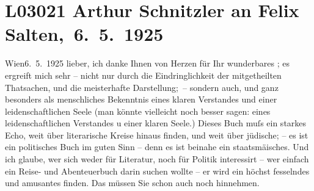 

\section[ Arthur Schnitzler an Felix Salten, 6. 5. 1925]{L03021 Arthur Schnitzler an Felix Salten, 6. 5. 1925}
\nopagebreak{}
\rehead{ }\normalsize\beginnumbering{}
\toendnotes[C]{\smallbreak\pagebreak[2]}
\toendnotes[C]{\smallbreak}
\pstart
           \raggedleft{}{\pb}Wien6. 5. 1925\pend
           \vspace{0.5em}
\pstart
           lieber, ich danke Ihnen von Herzen für Ihr wunderbares \label{K_L03021-1v}\label{K_L03021-1}; es
               ergreift mich sehr – nicht nur durch die Eindringlichkeit der mitgetheilten
               Thatsachen, und die meisterhafte Darstellung; – sondern auch, und ganz besonders als
               menschliches Bekenntnis eines klaren Verstandes und einer leidenschaftlichen Seele (man
               könnte vielleicht noch besser sagen: eines leidenschaftlichen Verstandes u einer
               klaren Seele.) Dieses Buch
               muſs ein starkes Echo, weit über literarische Kreise hinaus finden, und weit über
               jüdische; – es ist ein politisches Buch im guten Sinn – denn es ist beinahe ein
                  staatsmä{\geminationn}isches. Und ich glaube, wer sich weder für
               Literatur, noch {\pb}für Politik interessirt –
               wer einfach ein Reise- und Abenteuerbuch darin \strikeout{\textcolor{gray}{finden}} suchen wollte – er wird ein höchst fesselndes und amusantes \strikeout{\textcolor{gray}{darin}} finden. Das müssen Sie schon
               auch noch hinnehmen.\pend
           
